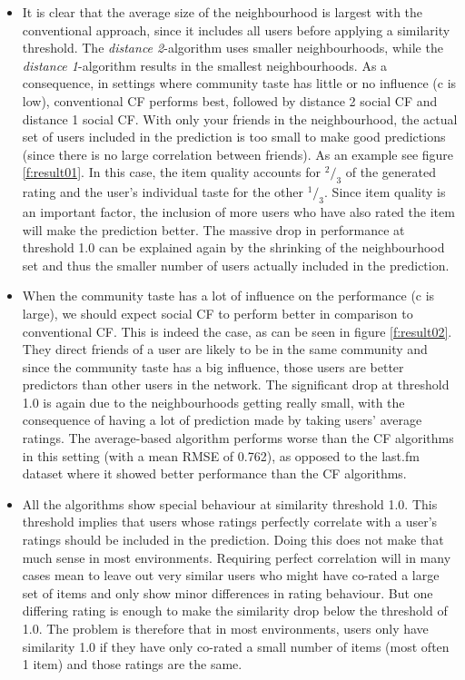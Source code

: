 \begin{itemize}
\item It is clear that the average size of the neighbourhood is largest with the conventional approach, since it includes all users before applying a similarity threshold. The \textit{distance 2}-algorithm uses smaller neighbourhoods, while the \textit{distance 1}-algorithm results in the smallest neighbourhoods. As a consequence, in settings where community taste has little or no influence (c is low), conventional CF performs best, followed by distance 2 social CF and distance 1 social CF. With only your friends in the neighbourhood, the actual set of users included in the prediction is too small to make good predictions (since there is no large correlation between friends). As an example see figure \ref{f:result01}. In this case, the item quality accounts for $^2 / _3$ of the generated rating and the user's individual taste for the other $^1 / _3$. Since item quality is an important factor, the inclusion of more users who have also rated the item will make the prediction better. The massive drop in performance at threshold 1.0 can be explained again by the shrinking of the neighbourhood set and thus the smaller number of users actually included in the prediction.
\item When the community taste has a lot of influence on the performance (c is large), we should expect social CF to perform better in comparison to conventional CF. This is indeed the case, as can be seen in figure \ref{f:result02}. They direct friends of a user are likely to be in the same community and since the community taste has a big influence, those users are better predictors than other users in the network. The significant drop at threshold 1.0 is again due to the neighbourhoods getting really small, with the consequence of having a lot of prediction made by taking users' average ratings. The average-based algorithm performs worse than the CF algorithms in this setting (with a mean RMSE of 0.762), as opposed to the last.fm dataset where it showed better performance than the CF algorithms.
\item All the algorithms show special behaviour at similarity threshold 1.0. This threshold implies that users whose ratings perfectly correlate with a user's ratings should be included in the prediction. Doing this does not make that much sense in most environments. Requiring perfect correlation will in many cases mean to leave out very similar users who might have co-rated a large set of items and only show minor differences in rating behaviour. But one differing rating is enough to make the similarity drop below the threshold of 1.0. The problem is therefore that in most environments, users only have similarity 1.0 if they have only co-rated a small number of items (most often 1 item) and those ratings are the same.
\end{itemize}


